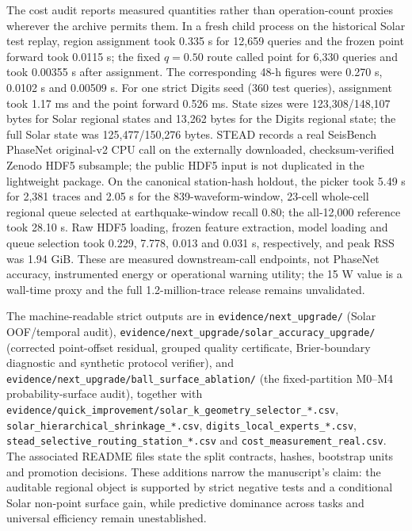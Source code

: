 \documentclass[11pt,a4paper]{article}
\numberwithin{equation}{section}
\theoremstyle{definition}\newtheorem{definition}[theorem]{Definition}
\theoremstyle{remark}\newtheorem{remark}[theorem]{Remark}
\begin{document}
The cost audit reports measured quantities rather than operation-count proxies wherever the archive permits them. In a fresh child process on the historical Solar test replay, region assignment took 0.335 s for 12,659 queries and the frozen point forward took 0.0115 s; the fixed $q=0.50$ route called point for 6,330 queries and took 0.00355 s after assignment. The corresponding 48-h figures were 0.270 s, 0.0102 s and 0.00509 s. For one strict Digits seed (360 test queries), assignment took 1.17 ms and the point forward 0.526 ms. State sizes were 123,308/148,107 bytes for Solar regional states and 13,262 bytes for the Digits regional state; the full Solar state was 125,477/150,276 bytes. STEAD records a real SeisBench PhaseNet original-v2 CPU call on the externally downloaded, checksum-verified Zenodo HDF5 subsample; the public HDF5 input is not duplicated in the lightweight package. On the canonical station-hash holdout, the picker took 5.49 s for 2,381 traces and 2.05 s for the 839-waveform-window, 23-cell whole-cell regional queue selected at earthquake-window recall 0.80; the all-12,000 reference took 28.10 s. Raw HDF5 loading, frozen feature extraction, model loading and queue selection took 0.229, 7.778, 0.013 and 0.031 s, respectively, and peak RSS was 1.94 GiB. These are measured downstream-call endpoints, not PhaseNet accuracy, instrumented energy or operational warning utility; the 15 W value is a wall-time proxy and the full 1.2-million-trace release remains unvalidated.

The machine-readable strict outputs are in \texttt{evidence/next\_upgrade/} (Solar OOF/temporal audit), \texttt{evidence/next\_upgrade/solar\_accuracy\_upgrade/} (corrected point-offset residual, grouped quality certificate, Brier-boundary diagnostic and synthetic protocol verifier), and \texttt{evidence/next\_upgrade/ball\_surface\_ablation/} (the fixed-partition M0--M4 probability-surface audit), together with \texttt{evidence/quick\_improvement/solar\_k\_geometry\_selector\_*.csv}, \texttt{solar\_hierarchical\_shrinkage\_*.csv}, \texttt{digits\_local\_experts\_*.csv}, \texttt{stead\_selective\_routing\_station\_*.csv} and \texttt{cost\_measurement\_real.csv}. The associated README files state the split contracts, hashes, bootstrap units and promotion decisions. These additions narrow the manuscript's claim: the auditable regional object is supported by strict negative tests and a conditional Solar non-point surface gain, while predictive dominance across tasks and universal efficiency remain unestablished.
\end{document}
